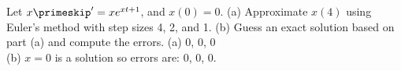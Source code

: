 {Let $x\primeskip' = x e^{xt+1}$, and $x(0)=0$.
(a) Approximate $x(4)$ using Euler's method with step sizes 4, 2, and 1.
(b) Guess an exact solution based on part (a) and compute the errors.}
{(a) 0, 0, 0\\
(b) $x=0$ is a solution so errors are: 0, 0, 0.}